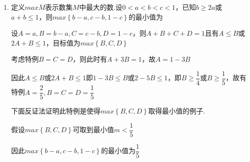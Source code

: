 \begin{enumerate}
\begin{jieda}
        因此$max\left\{b-a, c-b, 1-c\right\}$的最小值为$\dfrac{1}{4}$
    \end{jieda}
    \item 定义$max M$表示数集$M$中最大的数.设$0<a<b<c<1$，已知$b\geq 2a$或$a+b\leq 1$，则$max\left\{b-a, c-b, 1-c\right\}$的最小值为
    \begin{jieda}
        设$A = a, B = b-a, C = c - b, D = 1 - c$，则$A+B+C+D = 1$且有$A \leq B$或$2A+B \leq 1$，目标值为$max\left\{B, C, D\right\}$

        
        考虑特例$B = C = D$，则此时有$A+3B = 1$，故$A = 1-3B$
        
        因此$A \leq B$或$2A+B \leq 1$即$1-3B \leq B$或$2-5B \leq 1$，即$B \geq \dfrac{1}{4}$或$B \geq \dfrac{1}{5}$，故有特例$A = \dfrac{2}{5}, B = C = D = \dfrac{1}{5}$
        
        下面反证法证明此特例是使得$max\left\{B, C, D\right\}$取得最小值的例子.

        
        假设$max\left\{B, C, D\right\}$可取到最小值$m < \dfrac{1}{5}$
        
        
        
        因此$max\left\{b-a, c-b, 1-c\right\}$的最小值为$\dfrac{1}{5}$
    \end{jieda}
\end{enumerate}

